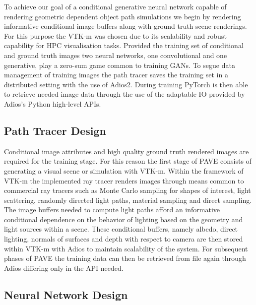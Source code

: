 \documentclass[sigconf]{acmart}%
\begin{document}
To achieve our goal of a conditional generative neural network capable of rendering geometric dependent object path simulations we begin by rendering informative conditional image buffers along with ground truth scene renderings. For this purpose the VTK-m was chosen due to its scalability and robust capability for HPC visualisation tasks. Provided the training set of conditional and ground truth images two neural networks, one convolutional and one generative, play a zero-sum game common to training GANs. To segue data management of training images the path tracer saves the training set in a distributed setting with the use of Adios2. During training PyTorch is then able to retrieve needed image data through the use of the adaptable IO provided by Adios's Python high-level APIs.

\subsection{Path Tracer Design}

Conditional image attributes and high quality ground truth rendered images are required for the training stage. For this reason the first stage of PAVE consists of generating a visual scene or simulation with VTK-m. Within the framework of VTK-m the implemented ray tracer renders images through means common to commercial ray tracers such as Monte Carlo sampling for shapes of interest, light scattering, randomly directed light paths, material sampling and direct sampling. The image buffers needed to compute light paths afford an informative conditional dependence on the behavior of lighting based on the geometry and light sources within a scene. These conditional buffers, namely albedo, direct lighting, normals of surfaces and depth with respect to camera are then stored within VTK-m with Adios to maintain scalability of the system. For subsequent phases of PAVE the training data can then be retrieved from file again through Adios differing only in the API needed. 

\subsection{Neural Network Design}
\end{document}
